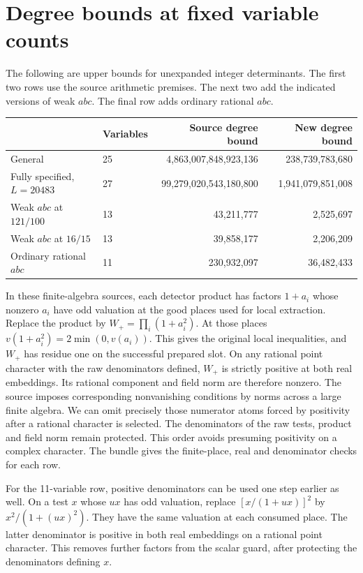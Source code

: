 \section{Degree bounds at fixed variable counts}
The following are upper bounds for unexpanded integer determinants. The first two rows use the source arithmetic premises. The next two add the indicated versions of weak $abc$. The final row adds ordinary rational $abc$.
\begin{center}\small
\begin{tabular}{llrr}
\toprule
&Variables&Source degree bound&New degree bound\\
\midrule
General&25&4,863,007,848,923,136&238,739,783,680\\
Fully specified, $L=20483$&27&99,279,020,543,180,800&1,941,079,851,008\\
Weak $abc$ at $121/100$&13&43,211,777&2,525,697\\
Weak $abc$ at $16/15$&13&39,858,177&2,206,209\\
Ordinary rational $abc$&11&230,932,097&36,482,433\\
\bottomrule
\end{tabular}\end{center}

In these finite-algebra sources, each detector product has factors $1+a_i$ whose nonzero $a_i$ have odd valuation at the good places used for local extraction. Replace the product by $W_+=\prod_i(1+a_i^2)$. At those places $v(1+a_i^2)=2\min(0,v(a_i))$. This gives the original local inequalities, and $W_+$ has residue one on the successful prepared slot. On any rational point character with the raw denominators defined, $W_+$ is strictly positive at both real embeddings. Its rational component and field norm are therefore nonzero. The source imposes corresponding nonvanishing conditions by norms across a large finite algebra. We can omit precisely those numerator atoms forced by positivity after a rational character is selected. The denominators of the raw tests, product and field norm remain protected. This order avoids presuming positivity on a complex character. The bundle gives the finite-place, real and denominator checks for each row.

For the 11-variable row, positive denominators can be used one step earlier as well. On a test $x$ whose $ux$ has odd valuation, replace $[x/(1+ux)]^2$ by $x^2/(1+(ux)^2)$. They have the same valuation at each consumed place. The latter denominator is positive in both real embeddings on a rational point character. This removes further factors from the scalar guard, after protecting the denominators defining $x$.

